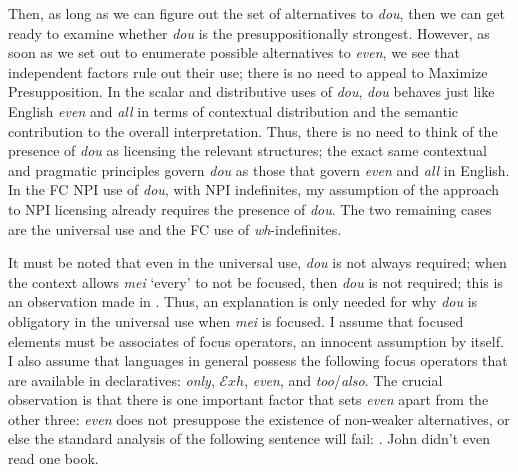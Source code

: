 \documentclass[12pt]{article}
\newcommand{\Exh}{\ensuremath{\mathcal{E}\mathit{xh}}}
\begin{document}
Then, as long as we can figure out the set of alternatives to \emph{dou}, then we can get ready to examine whether \emph{dou} is the presuppositionally strongest.
However, as soon as we set out to enumerate possible alternatives to \emph{even}, we see that independent factors rule out their use; there is no need to appeal to Maximize Presupposition.
In the scalar and distributive uses of \emph{dou}, \emph{dou} behaves just like English \emph{even} and \emph{all} in terms of contextual distribution and the semantic contribution to the overall interpretation.
Thus, there is no need to think of the presence of \emph{dou} as licensing the relevant structures; the exact same contextual and pragmatic principles govern \emph{dou} as those that govern \emph{even} and \emph{all} in English.
In the FC NPI use of \emph{dou}, with NPI indefinites, my assumption of the approach to NPI licensing \citet{lahiriFocusNegativePolarity1998,crnicNonmonotonicityNPILicensing2014} already requires the presence of \emph{dou}.
The two remaining cases are the universal use and the FC use of \emph{wh}-indefinites.

It must be noted that even in the universal use, \emph{dou} is not always required; when the context allows \emph{mei} `every' to not be focused, then \emph{dou} is not required; this is an observation made in \citet{liuPragmaticExplanationMeidou2021}.
Thus, an explanation is only needed for why \emph{dou} is obligatory in the universal use when \emph{mei} is focused.
I assume that focused elements must be associates of focus operators, an innocent assumption by itself.
I also assume that languages in general possess the following focus operators that are available in declaratives: \emph{only}, {\Exh}, \emph{even}, and \emph{too}/\emph{also}.
The crucial observation is that there is one important factor that sets \emph{even} apart from the other three: \emph{even} does not presuppose the existence of non-weaker alternatives, or else the standard analysis of the following sentence will fail:
\ex. John didn't even read one book.
\end{document}
